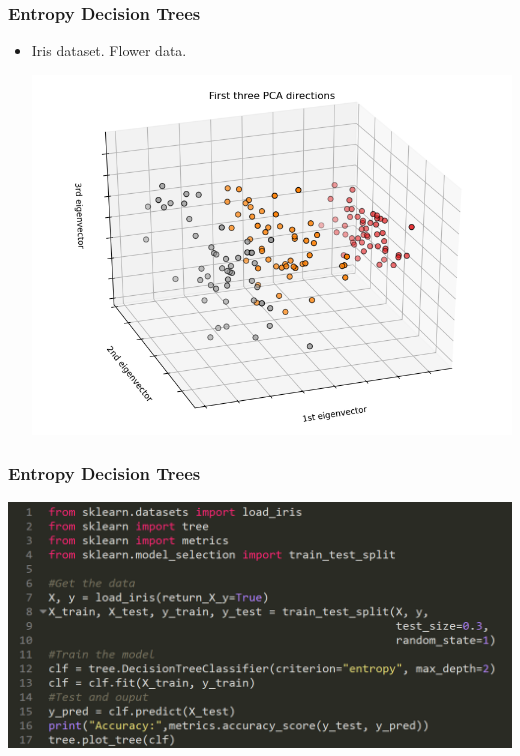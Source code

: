 \documentclass[xcolor=dvipsnames]{beamer}
\begin{document}
    \begin{frame}
    \frametitle{Entropy Decision Trees}
    \begin{itemize}
        \item Iris dataset. Flower data. 
        \begin{center}
            \includegraphics[scale=.4]{iris.png}
        \end{center}
    \end{itemize}
    \end{frame}
    
    \begin{frame}
    \frametitle{Entropy Decision Trees}
        \begin{center}
            \includegraphics[width=\textwidth]{edtcode.PNG}
        \end{center}
    \end{frame}
    
\end{document}
